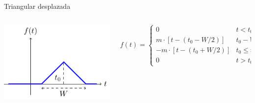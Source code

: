 \documentclass[aspectratio=169, usenames,svgnames,dvipsnames]{beamer}
\begin{document}
\begin{frame}[label={sec:org6cbacbe}]{Triangular desplazada}
\begin{columns}
\begin{column}{0.4\columnwidth}
\begin{center}
\includegraphics[width=.9\linewidth]{../figs/triangular_t0.pdf}
\end{center}
\end{column}

\begin{column}{0.6\columnwidth}
\[
  f(t) = %
  \begin{cases}
    0 & t < t_0 - W/2\\
    m \cdot [t - (t_0 -  W/2)]  & t_0 - W/2 \leq t \leq t_0\\
    -m \cdot [t - (t_0 + W/2)]  & t_0 \leq t \leq t_0 + W/2\\
    0  & t > t_0 + W/2
  \end{cases}
  \]
\end{column}
\end{columns}
\end{frame}
\end{document}
